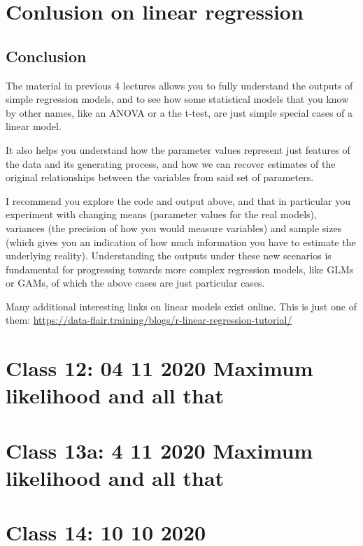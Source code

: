 \documentclass[
]{book}
\begin{document}
\hypertarget{conlusion-on-linear-regression}{%
\chapter{Conlusion on linear regression}\label{conlusion-on-linear-regression}}

\hypertarget{conclusion}{%
\section{Conclusion}\label{conclusion}}

The material in previous 4 lectures allows you to fully understand the outputs of simple regression models, and to see how some statistical models that you know by other names, like an ANOVA or a the t-test, are just simple special cases of a linear model.

It also helps you understand how the parameter values represent just features of the data and its generating process, and how we can recover estimates of the original relationships between the variables from said set of parameters.

I recommend you explore the code and output above, and that in particular you experiment with changing means (parameter values for the real models), variances (the precision of how you would measure variables) and sample sizes (which gives you an indication of how much information you have to estimate the underlying reality). Understanding the outputs under these new scenarios is fundamental for progressing towards more complex regression models, like GLMs or GAMs, of which the above cases are just particular cases.

Many additional interesting links on linear models exist online. This is just one of them: \url{https://data-flair.training/blogs/r-linear-regression-tutorial/}

\hypertarget{aula12}{%
\chapter{Class 12: 04 11 2020 Maximum likelihood and all that}\label{aula12}}

\hypertarget{aula13a}{%
\chapter{Class 13a: 4 11 2020 Maximum likelihood and all that}\label{aula13a}}

\hypertarget{aula14}{%
\chapter{Class 14: 10 10 2020}\label{aula14}}
\end{document}
